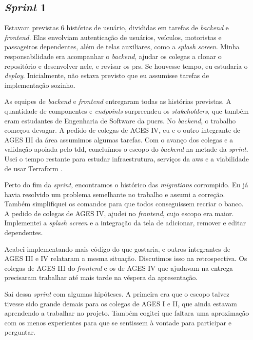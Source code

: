 \subsection{\textit{Sprint} 1}

Estavam previstas 6 histórias de usuário, divididas em tarefas de
\textit{backend} e \textit{frontend}. Elas envolviam autenticação de usuários,
veículos, motoristas e passageiros dependentes, além de telas auxiliares, como
a \textit{splash screen}. Minha responsabilidade era acompanhar o
\textit{backend}, ajudar os colegas a clonar o repositório e desenvolver nele,
e revisar os \acp{pr}. Se houvesse tempo, eu estudaria o \textit{deploy}.
Inicialmente, não estava previsto que eu assumisse tarefas de implementação
sozinho.

As equipes de \textit{backend} e \textit{frontend} entregaram todas as histórias
previstas. A quantidade de componentes e \textit{endpoints} surpreendeu os
\textit{stakeholders}, que também eram estudantes de Engenharia de Software da
\ac{pucrs}. No \textit{backend}, o trabalho começou devagar. A pedido de colegas
de AGES IV, eu e o outro integrante de AGES III da área assumimos algumas
tarefas. Com o avanço dos colegas e a validação apoiada pelo \ac{tdd},
concluímos o escopo do \textit{backend} na metade da \textit{sprint}. Usei o
tempo restante para estudar infraestrutura, serviços da \ac{aws} e a
viabilidade de usar Terraform \cite{terraform-docs}.

Perto do fim da \textit{sprint}, encontramos o histórico das
\textit{migrations} corrompido. Eu já havia resolvido um problema semelhante no
trabalho e assumi a correção. Também simplifiquei os comandos para que todos
conseguissem recriar o banco. A pedido de colegas de AGES IV, ajudei no
\textit{frontend}, cujo escopo era maior. Implementei a \textit{splash screen}
e a integração da tela de adicionar, remover e editar dependentes.

Acabei implementando mais código do que gostaria, e outros integrantes de
AGES III e IV relataram a mesma situação. Discutimos isso na retrospectiva.
Os colegas de AGES III do \textit{frontend} e os de AGES IV que ajudavam na
entrega precisaram trabalhar até mais tarde na véspera da apresentação.

Saí dessa \textit{sprint} com algumas hipóteses. A primeira era que o escopo
talvez tivesse sido grande demais para os colegas de AGES I e II, que ainda
estavam aprendendo a trabalhar no projeto. Também cogitei que faltara uma
aproximação com os menos experientes para que se sentissem à vontade para
participar e perguntar.

